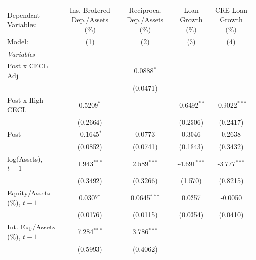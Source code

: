 
\begingroup
\centering
\begin{tabular}{lcccc}
   \tabularnewline \midrule \midrule
   Dependent Variables:           & Ins. Brokered Dep./Assets (\%)  & Reciprocal Dep./Assets (\%)  & Loan Growth (\%)  & CRE Loan Growth (\%)\\   
   Model:                         & (1)                             & (2)                          & (3)               & (4)\\  
   \midrule
   \emph{Variables}\\
   Post x CECL Adj                &                                 & 0.0888$^{*}$                 &                   &   \\   
                                  &                                 & (0.0471)                     &                   &   \\   
   Post x High CECL               & 0.5209$^{*}$                    &                              & -0.6492$^{**}$    & -0.9022$^{***}$\\   
                                  & (0.2664)                        &                              & (0.2506)          & (0.2417)\\   
   Post                           & -0.1645$^{*}$                   & 0.0773                       & 0.3046            & 0.2638\\   
                                  & (0.0852)                        & (0.0741)                     & (0.1843)          & (0.3432)\\   
   log(Assets), $t{-}1$           & 1.943$^{***}$                   & 2.589$^{***}$                & -4.691$^{***}$    & -3.777$^{***}$\\   
                                  & (0.3492)                        & (0.3266)                     & (1.570)           & (0.8215)\\   
   Equity/Assets (\%), $t{-}1$    & 0.0307$^{*}$                    & 0.0645$^{***}$               & 0.0257            & -0.0050\\   
                                  & (0.0176)                        & (0.0115)                     & (0.0354)          & (0.0410)\\   
   Int. Exp/Assets (\%), $t{-}1$  & 7.284$^{***}$                   & 3.786$^{***}$                &                   &   \\   
                                  & (0.5993)                        & (0.4062)                     &                   &   \\   

\end{tabular}
